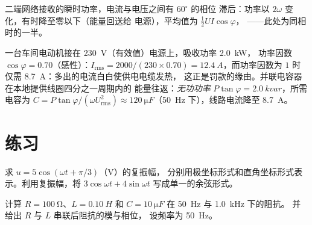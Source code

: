 \begin{omfigure}

{\small 二端网络接收的瞬时功率，电流与电压之间有 $60^\circ$ 的相位
滞后：功率以 $2\omega$ 变化，有时降至零以下（能量回送给
电源），平均值为 $\tfrac12 UI\cos\varphi$，
——此处为同相时的一半。}
\end{omfigure}

\begin{example}[功率因数校正]\label{ex:b1:sinusoidal-impedance:pf}
一台车间电动机接在 \qty{230}{V}（有效值）电源上，吸收功率 \qty{2.0}{kW}，
功率因数 $\cos\varphi = 0.70$（感性）：$I_{\mathrm{rms}} = 2000/(230 \times
0.70) = \qty{12.4}{A}$，而功率因数为
$1$ 时仅需 \qty{8.7}{A}：多出的电流白白使供电电缆发热，
这正是罚款的缘由。并联电容器在本地提供线圈四分之一周期内的
能量往返：\emph{无功功率} $P\tan\varphi =
\qty{2.0}{kvar}$，所需电容为 $C = P\tan\varphi/(\omega U_{\mathrm{rms}}^2)
\approx \qty{120}{\micro F}$（\qty{50}{Hz} 下），线路电流降至
\qty{8.7}{A}。
\end{example}

\section{练习}

\begin{exercise}[$\star$]\label{exo:b1:sinusoidal-impedance:1}
求 $u = 5\cos(\omega t + \pi/3)$（V）的复振幅，
分别用极坐标形式和直角坐标形式表示。利用复振幅，将 $3\cos\omega t
+ 4\sin\omega t$ 写成单一的余弦形式。
\end{exercise}

\begin{exercise}[$\star$]\label{exo:b1:sinusoidal-impedance:2}
计算 $R = \qty{100}{\ohm}$、$L = \qty{0.10}{H}$ 和
$C = \qty{10}{\micro F}$ 在 \qty{50}{Hz} 与 \qty{1.0}{kHz} 下的阻抗。
并给出 $R$ 与 $L$ 串联后阻抗的模与相位，
设频率为 \qty{50}{Hz}。
\end{exercise}

